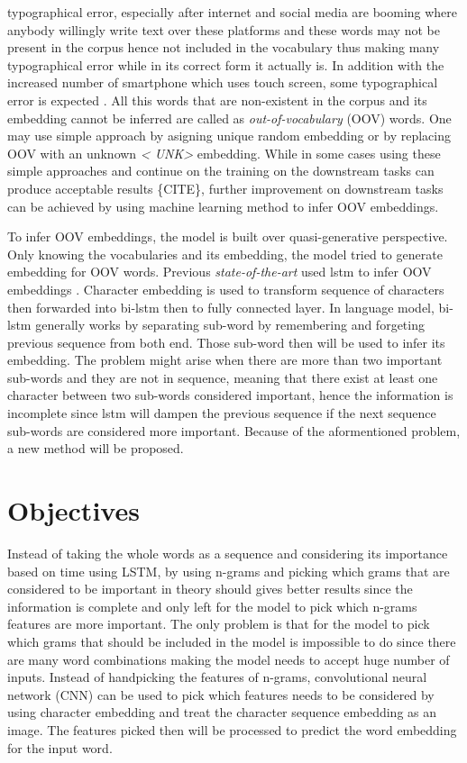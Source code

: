     typographical error, especially after internet and social media
    are booming where anybody willingly write text over these
    platforms and these words may not be present in the corpus hence
    not included in the vocabulary thus making many typographical
    error while in its correct form it actually is. In addition with
    the increased number of smartphone which uses touch screen, some
    typographical error is expected \citep{ghosh2017correction}. All
    this words that are non-existent in the corpus and its embedding
    cannot be inferred are called as \textit{out-of-vocabulary} (OOV)
    words. One may use simple approach by asigning unique random
    embedding or by replacing OOV with an unknown \textit{\textless
    UNK\textgreater} embedding. While in some cases using these simple
    approaches and continue on the training on the downstream tasks
    can produce acceptable results \{CITE\}, further improvement on
    downstream tasks can be achieved by using machine learning method
    to infer OOV embeddings.

    To infer OOV embeddings, the model is built over quasi-generative
    perspective. Only knowing the vocabularies and its embedding, the
    model tried to generate embedding for OOV words. Previous
    \textit{state-of-the-art} used lstm to infer OOV embeddings
    \citep{mimicking2017Pinter}. Character embedding is used to
    transform sequence of characters then forwarded into bi-lstm then
    to fully connected layer. In language model, bi-lstm generally
    works by separating sub-word by remembering and forgeting previous
    sequence from both end. Those sub-word then will be used to infer
    its embedding. The problem might arise when there are more than
    two important sub-words and they are not in sequence, meaning that
    there exist at least one character between two sub-words
    considered important, hence the information is incomplete since
    lstm will dampen the previous sequence if the next sequence
    sub-words are considered more important. Because of the
    aformentioned problem, a new method will be proposed.

\section{Objectives}
    Instead of taking the whole words as a sequence and considering
    its importance based on time using LSTM, by using n-grams and
    picking which grams that are considered to be important in theory
    should gives better results since the information is complete and
    only left for the model to pick which n-grams features are more
    important. The only problem is that for the model to pick which
    grams that should be included in the model is impossible to do
    since there are many word combinations making the model needs to
    accept huge number of inputs. Instead of handpicking the features
    of n-grams, convolutional neural network (CNN) can be used to pick
    which features needs to be considered by using character embedding
    and treat the character sequence embedding as an image. The
    features picked then will be processed to predict the word
    embedding for the input word.

